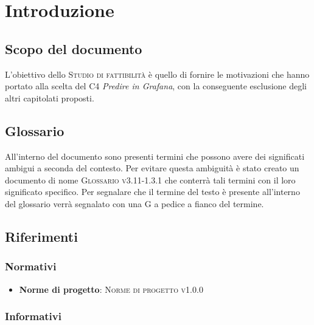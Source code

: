 \documentclass{article}
\begin{document}


\section{Introduzione}%
\label{sec:introduzione}

\subsection{Scopo del documento}%
\label{sub:scopo_del_documento}
L'obiettivo dello \textsc{Studio di fattibilità} è quello di fornire le motivazioni che hanno portato alla scelta del  C4 \emph{Predire in Grafana}, con la conseguente esclusione degli altri capitolati proposti.

\subsection{Glossario}%
\label{sub:glossario}
All'interno del documento sono presenti termini che possono avere dei significati ambigui a seconda del contesto. Per evitare questa ambiguità è stato creato un documento di nome \textsc{Glossario v3.11-1.3.1} che conterrà tali termini con il loro significato specifico. Per segnalare che il termine del testo è presente all'interno del glossario verrà segnalato con una G a pedice a fianco del termine.

\subsection{Riferimenti}%
\label{sub:riferimenti}

\subsubsection{Normativi}%
\label{subs:normativi}

\begin{itemize}
  \item \textbf{Norme di progetto}: \textsc{Norme di progetto v1.0.0}
\end{itemize}

\subsubsection{Informativi}%
\label{subs:informativi}
\end{document}
